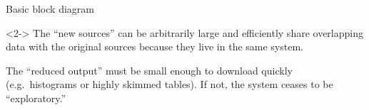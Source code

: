 \documentclass[aspectratio=169]{beamer}
\begin{document}
\begin{frame}{Basic block diagram}
\vspace{0.25 cm}
\begin{center}
\end{center}

\begin{uncoverenv}<2->
The ``new sources'' can be arbitrarily large and efficiently share overlapping data with the original sources because they live in the same system.

\vspace{0.25 cm}
The ``reduced output'' must be small enough to download quickly (e.g.\ histograms or highly skimmed tables). If not, the system ceases to be ``exploratory.''
\end{uncoverenv}
\end{frame}
\end{document}
